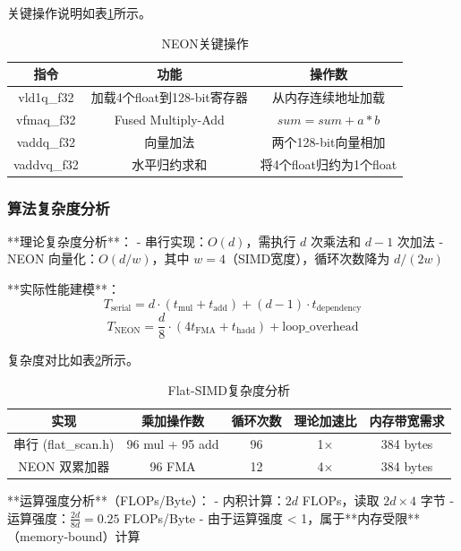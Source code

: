 \documentclass[a4paper]{article}
\begin{document}
关键操作说明如表\ref{table:neon_ops}所示。

\begin{table}[!htbp]
  \centering
  \begin{tabular}{ccc}
  \toprule  
  \textbf{指令} & \textbf{功能} & \textbf{操作数} \\
  \midrule
  vld1q\_f32 & 加载4个float到128-bit寄存器 & 从内存连续地址加载 \\
  vfmaq\_f32 & Fused Multiply-Add & $sum = sum + a * b$ \\
  vaddq\_f32 & 向量加法 & 两个128-bit向量相加 \\
  vaddvq\_f32 & 水平归约求和 & 将4个float归约为1个float \\
  \bottomrule
  \end{tabular}
  \caption{NEON关键操作}
  \label{table:neon_ops}
\end{table}

\subsubsection{算法复杂度分析}

**理论复杂度分析**：
- 串行实现：$O(d)$，需执行 $d$ 次乘法和 $d-1$ 次加法
- NEON 向量化：$O(d/w)$，其中 $w=4$（SIMD宽度），循环次数降为 $d/(2w)$

**实际性能建模**：
$$T_{\text{serial}} = d \cdot (t_{\text{mul}} + t_{\text{add}}) + (d-1) \cdot t_{\text{dependency}}$$
$$T_{\text{NEON}} = \frac{d}{8} \cdot (4t_{\text{FMA}} + t_{\text{hadd}}) + \text{loop\_overhead}$$

复杂度对比如表\ref{table:flat_complexity}所示。

\begin{table}[!htbp]
  \centering
  \begin{tabular}{ccccc}
  \toprule  
  \textbf{实现} & \textbf{乘加操作数} & \textbf{循环次数} & \textbf{理论加速比} & \textbf{内存带宽需求} \\
  \midrule
  串行 (flat\_scan.h) & 96 mul + 95 add & 96 & 1$\times$ & 384 bytes \\
  NEON 双累加器 & 96 FMA & 12 & 4$\times$ & 384 bytes \\
  \bottomrule
  \end{tabular}
  \caption{Flat-SIMD复杂度分析}
  \label{table:flat_complexity}
\end{table}

**运算强度分析**（FLOPs/Byte）：
- 内积计算：$2d$ FLOPs，读取 $2d \times 4$ 字节
- 运算强度：$\frac{2d}{8d} = 0.25$ FLOPs/Byte
- 由于运算强度 < 1，属于**内存受限**（memory-bound）计算
\end{document}
